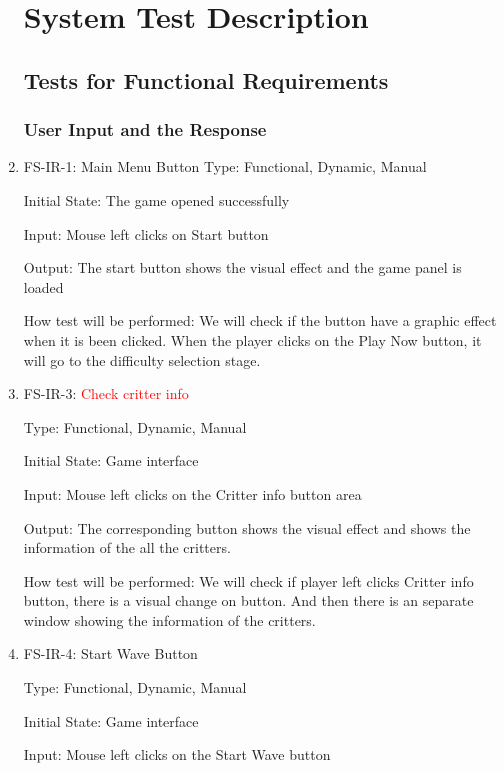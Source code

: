 \documentclass[12pt]{article}
\begin{document}
\begin{enumerate}
\section{System Test Description}
\subsection{Tests for Functional Requirements}

\subsubsection{User Input and the Response}
					
    \item{FS-IR-1: Main Menu Button}
    \color{red}
    Type: Functional, Dynamic, Manual
					
	Initial State: The game opened successfully
					
	Input: Mouse left clicks on Start button
					
	Output: The start button shows the visual effect and the game panel is loaded

	How test will be performed: We will check if the button have a graphic effect when it is been clicked. When the player clicks on the Play Now button, it will go to the difficulty selection stage. 
	\color{black}
	
	\item{FS-IR-3: \textcolor{red}{Check critter info}}
	
	Type: Functional, Dynamic, Manual
	
	Initial State: Game interface

	Input: Mouse left clicks on the Critter info button area

	Output: The corresponding button shows the visual effect and shows the information of the all the critters.

	How test will be performed: We will check if player left clicks Critter info button, there is a visual change on button. And then there is an separate window showing the information of the critters.

	
	\item{FS-IR-4: Start Wave Button}
					
	Type: Functional, Dynamic, Manual
					
	Initial State: Game interface
					
	Input: Mouse left clicks on the Start Wave button
					

\end{enumerate}
\end{document}
